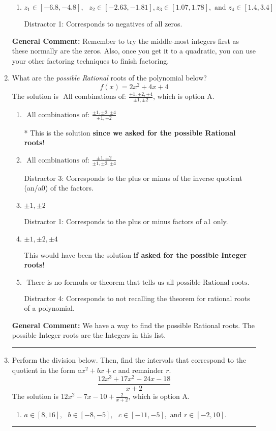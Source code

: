 \documentclass{extbook}[14pt]
\newcommand{\litem}[1]{\item #1

\rule{\textwidth}{0.4pt}}
\begin{document}
\begin{enumerate}
{\begin{enumerate}[label=\Alph*.]
 Distractor 4: Corresponds to moving factors from one rational to another.
\item \( z_1 \in [-6.8, -4.8], \text{   }  z_2 \in [-2.63, -1.81], z_3 \in [1.07, 1.78], \text{   and   } z_4 \in [1.4, 3.4] \)

 Distractor 1: Corresponds to negatives of all zeros.
\end{enumerate}

\textbf{General Comment:} Remember to try the middle-most integers first as these normally are the zeros. Also, once you get it to a quadratic, you can use your other factoring techniques to finish factoring.
}
\litem{
What are the \textit{possible Rational} roots of the polynomial below?
\[ f(x) = 2x^{2} +4 x + 4 \]The solution is \( \text{ All combinations of: }\frac{\pm 1,\pm 2,\pm 4}{\pm 1,\pm 2} \), which is option A.\begin{enumerate}[label=\Alph*.]
\item \( \text{ All combinations of: }\frac{\pm 1,\pm 2,\pm 4}{\pm 1,\pm 2} \)

* This is the solution \textbf{since we asked for the possible Rational roots}!
\item \( \text{ All combinations of: }\frac{\pm 1,\pm 2}{\pm 1,\pm 2,\pm 4} \)

 Distractor 3: Corresponds to the plus or minus of the inverse quotient (an/a0) of the factors. 
\item \( \pm 1,\pm 2 \)

 Distractor 1: Corresponds to the plus or minus factors of a1 only.
\item \( \pm 1,\pm 2,\pm 4 \)

This would have been the solution \textbf{if asked for the possible Integer roots}!
\item \( \text{ There is no formula or theorem that tells us all possible Rational roots.} \)

 Distractor 4: Corresponds to not recalling the theorem for rational roots of a polynomial.
\end{enumerate}

\textbf{General Comment:} We have a way to find the possible Rational roots. The possible Integer roots are the Integers in this list.
}
\litem{
Perform the division below. Then, find the intervals that correspond to the quotient in the form $ax^2+bx+c$ and remainder $r$.
\[ \frac{12x^{3} +17 x^{2} -24 x -18}{x + 2} \]The solution is \( 12x^{2} -7 x -10 + \frac{2}{x + 2} \), which is option A.\begin{enumerate}[label=\Alph*.]
\item \( a \in [8, 16], \text{   } b \in [-8, -5], \text{   } c \in [-11, -5], \text{   and   } r \in [-2, 10]. \)


\end{enumerate}}
\end{enumerate}
\end{document}

